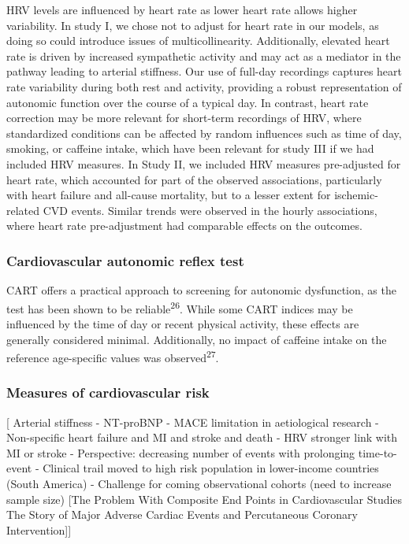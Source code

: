 \documentclass[
  a4paper,
  headsepline=true,
  open=any]{scrbook}
\begin{document}
HRV levels are influenced by heart rate as lower heart rate allows
higher variability. In study I, we chose not to adjust for heart rate in
our models, as doing so could introduce issues of multicollinearity.
Additionally, elevated heart rate is driven by increased sympathetic
activity and may act as a mediator in the pathway leading to arterial
stiffness. Our use of full-day recordings captures heart rate
variability during both rest and activity, providing a robust
representation of autonomic function over the course of a typical day.
In contrast, heart rate correction may be more relevant for short-term
recordings of HRV, where standardized conditions can be affected by
random influences such as time of day, smoking, or caffeine intake,
which have been relevant for study III if we had included HRV measures.
In Study II, we included HRV measures pre-adjusted for heart rate, which
accounted for part of the observed associations, particularly with heart
failure and all-cause mortality, but to a lesser extent for
ischemic-related CVD events. Similar trends were observed in the hourly
associations, where heart rate pre-adjustment had comparable effects on
the outcomes.

\hypertarget{cardiovascular-autonomic-reflex-test}{%
\subsubsection{Cardiovascular autonomic reflex
test}\label{cardiovascular-autonomic-reflex-test}}

CART offers a practical approach to screening for autonomic dysfunction,
as the test has been shown to be reliable\textsuperscript{26}. While
some CART indices may be influenced by the time of day or recent
physical activity, these effects are generally considered minimal.
Additionally, no impact of caffeine intake on the reference age-specific
values was observed\textsuperscript{27}.

\hypertarget{measures-of-cardiovascular-risk}{%
\subsubsection{Measures of cardiovascular
risk}\label{measures-of-cardiovascular-risk}}

{[} Arterial stiffness - NT-proBNP - MACE limitation in aetiological
research - Non-specific heart failure and MI and stroke and death - HRV
stronger link with MI or stroke - Perspective: decreasing number of
events with prolonging time-to-event - Clinical trail moved to high risk
population in lower-income countries (South America) - Challenge for
coming observational cohorts (need to increase sample size) {[}The
Problem With Composite End Points in Cardiovascular Studies The Story of
Major Adverse Cardiac Events and Percutaneous Coronary
Intervention{]}{]}
\end{document}
